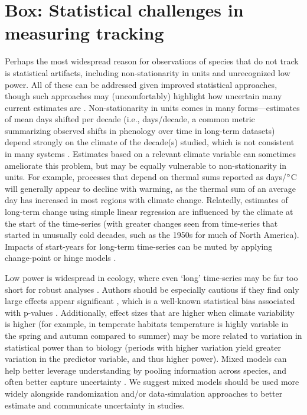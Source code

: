 \documentclass[11pt,letterpaper]{article}
\begin{document}
\section{Box: Statistical challenges in measuring tracking}
Perhaps the most widespread reason for observations of species that do not track is statistical artifacts, including non-stationarity in units and unrecognized low power. All of these can be addressed given improved statistical approaches, though such approaches may (uncomfortably) highlight how uncertain many current estimates are \citep{brown2016}. Non-stationarity in units comes in many forms---estimates of mean days shifted per decade (i.e., days/decade, a common metric summarizing observed shifts in phenology over time in long-term datasets) depend strongly on the climate of the decade(s) studied, which is not consistent in many systems \citep{Ault2011,McCabe2012}. Estimates based on a relevant climate variable can sometimes ameliorate this problem, but may be equally vulnerable to non-stationarity in units. For example, processes that depend on thermal sums reported as days/$\degree$C will generally appear to decline with warming, as the thermal sum of an average day has increased in most regions with climate change. Relatedly, estimates of long-term change using simple linear regression are influenced by the climate at the start of the time-series (with greater changes seen from time-series that started in unusually cold decades, such as the 1950s for much of North America). Impacts of start-years for long-term time-series can be muted by applying change-point or hinge models \citep[e.g.,][]{kharouba2018}. 

Low power is widespread in ecology, where even `long' time-series may be far too short for robust analyses \citep{bolmgren2013,kharouba2018}. Authors should be especially cautious if they find only large effects appear significant \citep[e.g.,][]{CaraDonna2014}, which is a well-known statistical bias associated with p-values \citep{loken2017}. Additionally, effect sizes that are higher when climate variability is higher (for example, in temperate habitats temperature is highly variable in the spring and autumn compared to summer) may be more related to variation in statistical power than to biology (periods with higher variation yield greater variation in the predictor variable, and thus higher power). Mixed models can help better leverage understanding by pooling information across species, and often better capture uncertainty \citep{pearse2017}. We suggest mixed models should be used more widely alongside randomization and/or data-simulation approaches \citep[e.g.,][]{bolmgren2013,kharouba2018} to better estimate and communicate uncertainty in studies. 
\end{document}

